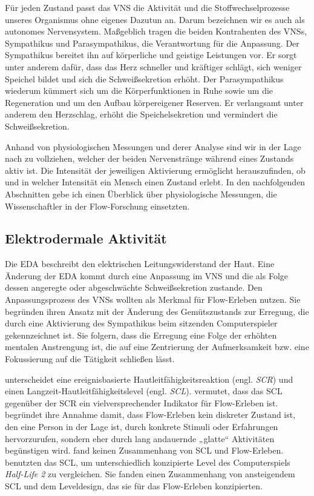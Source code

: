 Für jeden Zustand passt das \ac{VNS} die Aktivität und die Stoffwechselprozesse unseres Organismus ohne eigenes Dazutun an. Darum bezeichnen wir es auch als autonomes Nervensystem. Maßgeblich tragen die beiden Kontrahenten des \ac{VNS}s, Sympathikus und Parasympathikus, die Verantwortung für die Anpassung. Der Sympathikus bereitet ihn auf körperliche und geistige Leistungen vor. Er sorgt unter anderem dafür, dass das Herz schneller und kräftiger schlägt, sich weniger Speichel bildet und sich die Schweißsekretion erhöht. Der Parasympathikus wiederum kümmert sich um die Körperfunktionen in Ruhe sowie um die Regeneration und um den Aufbau körpereigener Reserven. Er verlangsamt unter anderem den Herzschlag, erhöht die Speichelsekretion und vermindert die Schweißsekretion.

Anhand von physiologischen Messungen und derer Analyse sind wir in der Lage nach zu vollziehen, welcher der beiden Nervenstränge während eines Zustands aktiv ist. Die Intensität der jeweiligen Aktivierung ermöglicht herauszufinden, ob und in welcher Intensität ein Mensch einen Zustand erlebt. In den nachfolgenden Abschnitten gebe ich einen Überblick über physiologische Messungen, die Wissenschaftler in der Flow-Forschung einsetzten.

\subsection{Elektrodermale Aktivität}

Die \ac{EDA} beschreibt den elektrischen Leitungswiderstand der Haut. Eine Änderung der \ac{EDA} kommt durch eine Anpassung im \ac{VNS} und die als Folge dessen angeregte oder abgeschwächte Schweißsekretion zustande. Den Anpassungsprozess des \ac{VNS}s wollten \citet{Kivikangas2006, Nacke2008} als Merkmal für Flow-Erleben nutzen. Sie begründen ihren Ansatz mit der Änderung des Gemütszustands zur Erregung, die durch eine Aktivierung des Sympathikus beim sitzenden Computerspieler gekennzeichnet ist. Sie folgern, dass die Erregung eine Folge der erhöhten mentalen Anstrengung ist, die auf eine Zentrierung der Aufmerksamkeit bzw. eine Fokussierung auf die Tätigkeit schließen lässt.

\citet{Kilpatrick1972} unterscheidet eine ereignisbasierte Hautleitfähigkeitsreaktion (engl. \emph{\ac{SCR}}) und einen Langzeit-Hautleitfähigkeitslevel (engl. \emph{\ac{SCL}}). \citet[][S.~158]{Peifer2012} vermutet, dass das \ac{SCL} gegenüber der \ac{SCR} ein vielversprechender Indikator für Flow-Erleben ist. \citet[][S.~158]{Peifer2012} begründet ihre Annahme damit, dass Flow-Erleben kein diskreter Zustand ist, den eine Person in der Lage ist, durch konkrete Stimuli oder Erfahrungen hervorzurufen, sondern eher durch lang andauernde „glatte“ Aktivitäten begünstigen wird. \citet{Kilpatrick1972} fand keinen Zusammenhang von \ac{SCL} und Flow-Erleben. \citet{Nacke2008} benutzten das \ac{SCL}, um unterschiedlich konzipierte Level des Computerspiels \emph{Half-Life 2} zu vergleichen. Sie fanden einen Zusammenhang von ansteigendem \ac{SCL} und dem Leveldesign, das sie für das Flow-Erleben konzipierten.

